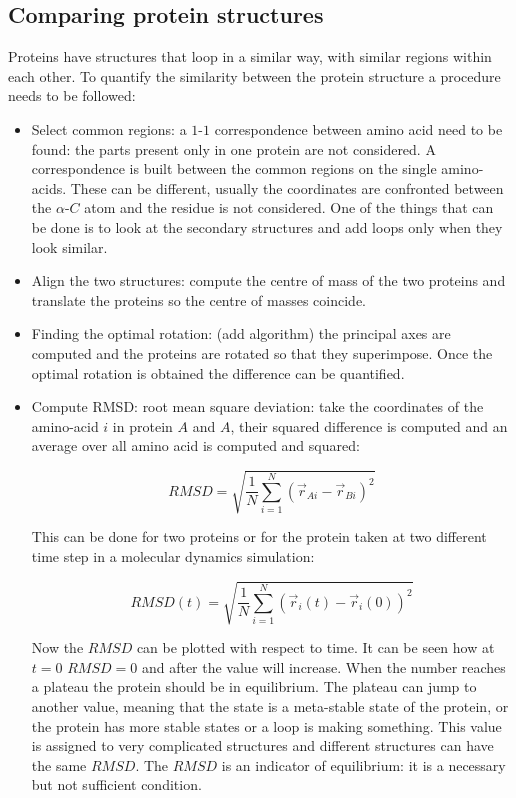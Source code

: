 	\subsection{Comparing protein structures}
	Proteins have structures that loop in a similar way, with similar regions within each other.
	To quantify the similarity between the protein structure a procedure needs to be followed:

	\begin{multicols}{2}
		\begin{itemize}
			\item Select common regions: a $1$-$1$ correspondence between amino acid need to be found: the parts present only in one protein are not considered.
				A correspondence is built between the common regions on the single amino-acids.
				These can be different, usually the coordinates are confronted between the $\alpha$-$C$ atom and the residue is not considered.
				One of the things that can be done is to look at the secondary structures and add loops only when they look similar.
			\item Align the two structures: compute the centre of mass of the two proteins and translate the proteins so the centre of masses coincide.
			\item Finding the optimal rotation: (add algorithm) the principal axes are computed and the proteins are rotated so that they superimpose.
				Once the optimal rotation is obtained the difference can be quantified.
			\item Compute RMSD: root mean square deviation: take the coordinates of the amino-acid $i$ in protein $A$ and $A$, their squared difference is computed and an average over all amino acid is computed and squared:

				$$RMSD = \sqrt{\frac{1}{N}\sum\limits_{i=1}^N(\vec{r}_{Ai}-\vec{r}_{Bi})^2}$$

				This can be done for two proteins or for the protein taken at two different time step in a molecular dynamics simulation:

				$$RMSD(t) = \sqrt{\frac{1}{N}\sum\limits_{i=1}^N(\vec{r}_{i}(t)-\vec{r}_{i}(0))^2}$$

				Now the $RMSD$ can be plotted with respect to time.
				It can be seen how at $t=0$ $RMSD=0$ and after the value will increase.
				When the number reaches a plateau the protein should be in equilibrium.
				The plateau can jump to another value, meaning that the state is a meta-stable state of the protein, or the protein has more stable states or a loop is making something.
				This value is assigned to very complicated structures and different structures can have the same $RMSD$.
				The $RMSD$ is an indicator of equilibrium: it is a necessary but not sufficient condition.
		\end{itemize}
	\end{multicols}

